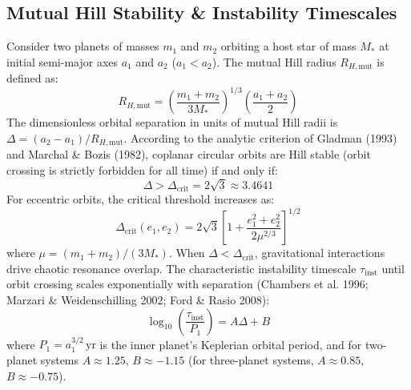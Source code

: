 \documentclass[11pt,a4paper]{article}
\begin{document}
\subsection{Mutual Hill Stability \& Instability Timescales}
Consider two planets of masses $m_1$ and $m_2$ orbiting a host star of mass $M_*$ at initial semi-major axes $a_1$ and $a_2$ ($a_1 < a_2$). The mutual Hill radius $R_{H,\text{mut}}$ is defined as:
\begin{equation}
R_{H,\text{mut}} = \left( \frac{m_1 + m_2}{3 M_*} \right)^{1/3} \left( \frac{a_1 + a_2}{2} \right)
\label{eq:mutual_hill}
\end{equation}
The dimensionless orbital separation in units of mutual Hill radii is $\Delta = (a_2 - a_1) / R_{H,\text{mut}}$. According to the analytic criterion of Gladman (1993) and Marchal \& Bozis (1982), coplanar circular orbits are Hill stable (orbit crossing is strictly forbidden for all time) if and only if:
\begin{equation}
\Delta > \Delta_{\text{crit}} = 2\sqrt{3} \approx 3.4641
\label{eq:gladman_limit}
\end{equation}
For eccentric orbits, the critical threshold increases as:
\begin{equation}
\Delta_{\text{crit}}(e_1, e_2) = 2\sqrt{3} \left[ 1 + \frac{e_1^2 + e_2^2}{2 \mu^{2/3}} \right]^{1/2}
\label{eq:gladman_ecc}
\end{equation}
where $\mu = (m_1 + m_2) / (3 M_*)$. When $\Delta < \Delta_{\text{crit}}$, gravitational interactions drive chaotic resonance overlap. The characteristic instability timescale $\tau_{\text{inst}}$ until orbit crossing scales exponentially with separation (Chambers et al. 1996; Marzari \& Weidenschilling 2002; Ford \& Rasio 2008):
\begin{equation}
\log_{10}\left( \frac{\tau_{\text{inst}}}{P_1} \right) = A \Delta + B
\label{eq:tau_inst}
\end{equation}
where $P_1 = a_1^{3/2}\,\text{yr}$ is the inner planet's Keplerian orbital period, and for two-planet systems $A \approx 1.25$, $B \approx -1.15$ (for three-planet systems, $A \approx 0.85$, $B \approx -0.75$).
\end{document}
